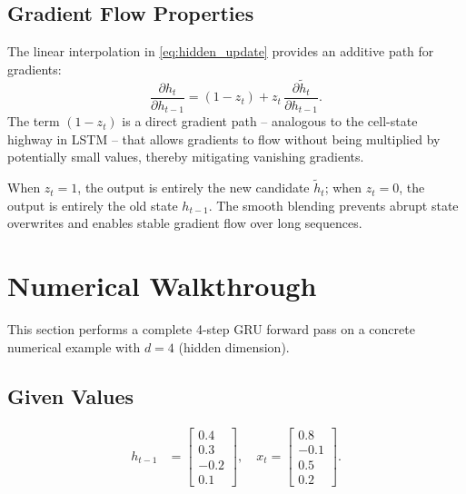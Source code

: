 \documentclass[12pt,a4paper]{article}
\begin{document}
\subsection{Gradient Flow Properties}

The linear interpolation in \cref{eq:hidden_update} provides an additive path for gradients:
\begin{equation}
  \frac{\partial h_t}{\partial h_{t-1}} = (1-z_t) + z_t\,\frac{\partial\tilde{h}_t}{\partial h_{t-1}}.
\end{equation}
The term $(1-z_t)$ is a direct gradient path -- analogous to the cell-state highway in LSTM --
that allows gradients to flow without being multiplied by potentially small values, thereby
mitigating vanishing gradients.

\begin{keyinsight}[title=Update Gate as Interpolation]
When $z_t = 1$, the output is entirely the new candidate $\tilde{h}_t$; when $z_t = 0$, the
output is entirely the old state $h_{t-1}$. The smooth blending prevents abrupt state overwrites
and enables stable gradient flow over long sequences.
\end{keyinsight}

\section{Numerical Walkthrough}
\label{sec:numerical}

This section performs a complete 4-step GRU forward pass on a concrete numerical example with
$d = 4$ (hidden dimension).

\subsection{Given Values}

\begin{align}
  h_{t-1} &= \begin{bmatrix} 0.4 \\ 0.3 \\ -0.2 \\ 0.1 \end{bmatrix},
  \quad
  x_t = \begin{bmatrix} 0.8 \\ -0.1 \\ 0.5 \\ 0.2 \end{bmatrix}.
\end{align}
\end{document}
